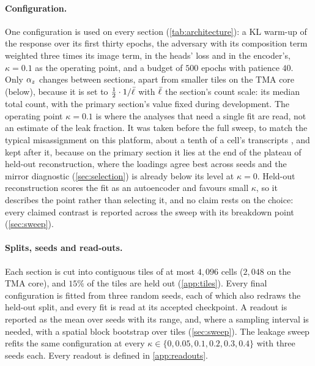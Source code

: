 \paragraph{Configuration.}
 One configuration is used on every section (\cref{tab:architecture}): a KL warm-up of the response over its first thirty epochs, the adversary with its composition term weighted three times its image term, in the heads' loss and in the encoder's, $\kappa = 0.1$ as the operating point, and a budget of $500$ epochs with patience $40$. Only $\alpha_z$ changes between sections, apart from smaller tiles on the TMA core (below), because it is set to $\tfrac12 \cdot 1/\bar{\ell}$ with $\bar{\ell}$ the section's count scale: its median total count, with the primary section's value fixed during development. The operating point $\kappa = 0.1$ is where the analyses that need a single fit are read, not an estimate of the leak fraction. It was taken before the full sweep, to match the typical misassignment on this platform, about a tenth of a cell's transcripts \citep{yang2025mistic}, and kept after it, because on the primary section it lies at the end of the plateau of held-out reconstruction, where the loadings agree best across seeds and the mirror diagnostic (\cref{sec:selection}) is already below its level at $\kappa = 0$. Held-out reconstruction scores the fit as an autoencoder and favours small $\kappa$, so it describes the point rather than selecting it, and no claim rests on the choice: every claimed contrast is reported across the sweep with its breakdown point (\cref{sec:sweep}).

\paragraph{Splits, seeds and read-outs.}
Each section is cut into contiguous tiles of at most $4{,}096$ cells ($2{,}048$ on the TMA core), and $15\%$ of the tiles are held out (\cref{app:tiles}). Every final configuration is fitted from three random seeds, each of which also redraws the held-out split, and every fit is read at its accepted checkpoint. A readout is reported as the mean over seeds with its range, and, where a sampling interval is needed, with a spatial block bootstrap over tiles (\cref{sec:sweep}). The leakage sweep refits the same configuration at every $\kappa \in \{0, 0.05, 0.1, 0.2, 0.3, 0.4\}$ with three seeds each. Every readout is defined in \cref{app:readouts}.

